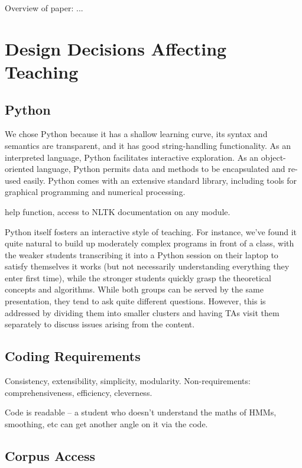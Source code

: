 \documentclass[11pt]{article}
\begin{document}
Overview of paper: ...

\section{Design Decisions Affecting Teaching}

\subsection{Python}

We chose Python because it has a shallow learning curve, its syntax
and semantics are transparent, and it has good string-handling
functionality.  As an interpreted language, Python facilitates
interactive exploration.  As an object-oriented language, Python
permits data and methods to be encapsulated and re-used easily.  Python comes with an extensive
standard library, including tools for graphical programming and
numerical processing.

help function, access to NLTK documentation on any module.

Python itself fosters an
interactive style of teaching.  For instance, we've found it quite
natural to build up moderately complex programs in front of a class,
with the weaker students transcribing it into a Python session on
their laptop to satisfy themselves it works (but not necessarily
understanding everything they enter first time), while the stronger
students quickly grasp the theoretical concepts and algorithms.  While
both groups can be served by the same presentation, they tend to ask
quite different questions.  However, this is addressed by dividing
them into smaller clusters and having TAs visit them separately to
discuss issues arising from the content.

\subsection{Coding Requirements}

Consistency, extensibility, simplicity, modularity.
Non-requirements: comprehensiveness, efficiency, cleverness.
\cite{LoperBird02}

Code is readable -- a student who doesn't understand the maths of HMMs,
smoothing, etc can get another angle on it via the code.

\subsection{Corpus Access}
\end{document}

